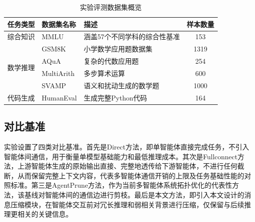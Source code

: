 \vspace{26pt}
\begin{table}[H]
    \centering
    {
        \fontsize{12pt}{26pt}\selectfont
        \begin{tabular}{|c|p{3.5cm}|p{6.5cm}|c|}
            \hline
            任务类型 & 数据集名称 & 描述 & 样本数量\\
            \hline
            综合知识 & MMLU\cite{ref61} & 涵盖57个不同学科的综合性基准 & 153 \\
            \hline
            \multirow{4}{*}{数学推理} & GSM8K\cite{ref62} & 小学数学应用题数据集 & 1319 \\
            \cline{2-4} %
             & AQuA\cite{ref63}& 复杂的代数应用题 & 254 \\
            \cline{2-4}
             & MultiArith\cite{ref64} & 多步算术运算 & 600 \\
            \cline{2-4}
             & SVAMP\cite{ref65} & 语义和扰动生成的数学题 & 1000 \\
            \hline
            代码生成 & HumanEval\cite{ref66} & 生成完整Python代码 & 164 \\
            \hline
        \end{tabular}
    }
    \caption{实验评测数据集概览}
    \label{tab:dataset_overview}
\end{table}

\subsection{对比基准}
实验设置了四类对比基准。首先是Direct方法，即单智能体直接完成任务，不引入智能体间通信，用于衡量单模型基础能力和最低推理成本。其次是Fullconnect方法，上游智能体生成的原始输出直接、完整地透传给下游智能体，不进行任何截断，从而保留完整上下文内容，代表多智能体通信开销的上限及任务基础性能的对照标准。第三是AgentPrune方法，作为当前多智能体系统拓扑优化的代表性方法，该基线对智能体间的通信边进行剪枝。最后是本文方法，即引入本文设计的消息压缩模块，在智能体交互前对冗长推理和弱相关背景进行压缩，仅保留与后续推理更相关的关键信息。

